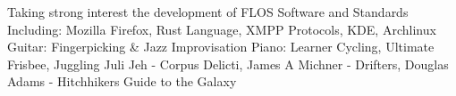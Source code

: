 \begin{cvskills}
   {Taking strong interest the development of FLOS Software and Standards\newline
   Including: Mozilla Firefox, Rust Language, XMPP Protocols, KDE, Archlinux }
   {Guitar: Fingerpicking \& Jazz Improvisation \newline
    Piano: Learner}
   {Cycling, Ultimate Frisbee, Juggling}
   {Juli Jeh - Corpus Delicti, James A Michner - Drifters, Douglas Adams - Hitchhikers Guide to the Galaxy}
  \end{cvskills}
